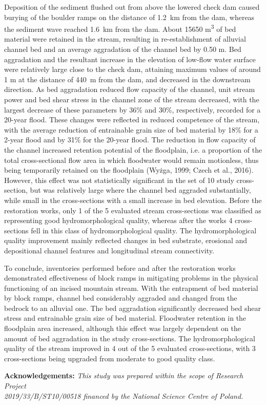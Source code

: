 {Deposition of the sediment flushed out from above the lowered check dam caused burying of the boulder ramps on the distance of 1.2~km from the dam, whereas the sediment wave reached 1.6~km from the dam. About 15650 m\textsuperscript{3} of bed material were retained in the stream, resulting in re-establishment of alluvial channel bed and an average aggradation of the channel bed by 0.50 m. Bed aggradation and the resultant increase in the elevation of low-flow water surface were relatively large close to the check dam, attaining maximum values of around 1 m at the distance of 440~m from the dam, and decreased in the downstream direction. As bed aggradation reduced flow capacity of the channel, unit stream power and bed shear stress in the channel zone of the stream decreased, with the largest decrease of these parameters by 36\% and 30\%, respectively, recorded for a 20-year flood. These changes were reflected in reduced competence of the stream, with the average reduction of entrainable grain size of bed material by 18\% for a 2-year flood and by 31\% for the 20-year flood. The reduction in flow capacity of the channel increased retention potential of the floodplain, i.e. a proportion of the total cross-sectional flow area in which floodwater would remain motionless, thus being temporarily retained on the floodplain (Wyżga, 1999; Czech et al., 2016). However, this effect was not statistically significant in the set of 10 study cross-section, but was relatively large where the channel bed aggraded substantially, while small in the cross-sections with a small increase in bed elevation. Before the restoration works, only 1 of the 5 evaluated stream cross-sections was classified as representing good hydromorphological quality, whereas after the works 4 cross-sections fell in this class of hydromorphological quality. The hydromorphological quality improvement mainly reflected changes in bed substrate, erosional and depositional channel features and longitudinal stream connectivity. 
	
To conclude, inventories performed before and after the restoration works demonstrated effectiveness of block ramps in mitigating problems in the physical functioning of an incised mountain stream. With the entrapment of bed material by block ramps, channel bed considerably aggraded and changed from the bedrock to an alluvial one. The bed aggradation significantly decreased bed shear stress and entrainable grain size of bed material. Floodwater retention in the floodplain area increased, although this effect was largely dependent on the amount of bed aggradation in the study cross-sections. The hydromorphological quality of the stream improved in 4 out of the 5 evaluated cross-sections, with 3 cross-sections being upgraded from moderate to good quality class. 

\vspace{0.5em}
\noindent
\textbf{Acknowledgements:}
\textit{This study was prepared within the scope of Research Project \\2019/33/B/ST10/00518 financed by the National Science Centre of Poland.}
}%
